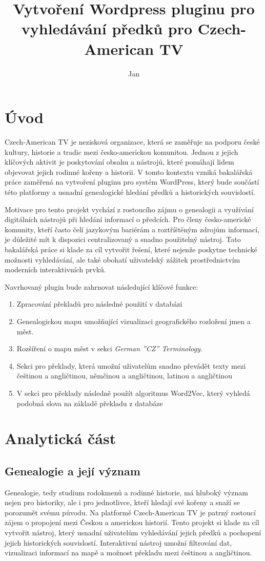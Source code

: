 \documentclass[czech, ba, kiv, he]{fasthesis}
\title{Vytvoření Wordpress pluginu pro vyhledávání předků pro Czech-American TV}
\author{Jan}{Čácha}{}{}
\begin{document}
\frontpages[tm]
\tableofcontents

\chapter{Úvod}
Czech-American TV je nezisková organizace, která se zaměřuje na podporu české kultury, historie a tradic mezi česko-americkou komunitou. Jednou z jejich klíčových aktivit je poskytování obsahu a nástrojů, které pomáhají lidem objevovat jejich rodinné kořeny a historii. V tomto kontextu vzniká bakalářská práce zaměřená na vytvoření pluginu pro systém WordPress, který bude součástí této platformy a usnadní genealogické hledání předků a historických souvislostí.

Motivace pro tento projekt vychází z rostoucího zájmu o genealogii a využívání digitálních nástrojů při hledání informací o předcích. Pro členy česko-americké komunity, kteří často čelí jazykovým bariérám a roztříštěným zdrojům informací, je důležité mít k dispozici centralizovaný a snadno použitelný nástroj. Tato bakalářská práce si klade za cíl vytvořit řešení, které nejenže poskytne technické možnosti vyhledávání, ale také obohatí uživatelský zážitek prostřednictvím moderních interaktivních prvků.

Navrhovaný plugin bude zahrnovat následující klíčové funkce:

\begin{enumerate}
    \item Zpracování překladů pro následné použití v databázi
    \item Genealogickou mapu umožňující vizualizaci geografického rozložení jmen a měst.
    \item Rozšíření o mapu měst v sekci \textit{German ''CZ'' Terminology}.
    \item Sekci pro překlady, která umožní uživatelům snadno převádět texty mezi češtinou a angličtinou, němčinou a angličtinou, latinou a 			angličtinou
    \item V sekci pro překlady následně použít algoritmus Word2Vec, který vyhledá podobná slova na základě překladu z databáze
\end{enumerate}
\chapter{Analytická část}

\section{Genealogie a její význam}
Genealogie, tedy studium rodokmenů a rodinné historie, má hluboký význam nejen pro historiky, ale i pro jednotlivce, kteří hledají své kořeny a snaží se porozumět svému původu. Na platformě Czech-American TV je patrný rostoucí zájem o propojení mezi Českou a americkou historií. Tento projekt si klade za cíl vytvořit nástroj, který usnadní uživatelům vyhledávání jejich předků a pochopení jejich historických souvislostí. Interaktivní nástroj umožní filtrování dat, vizualizaci informací na mapě a možnost překladu mezi češtinou a angličtinou.
\end{document}
